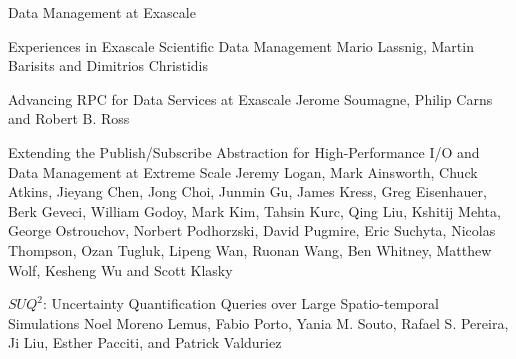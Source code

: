 \documentclass[11pt]{article}
\begin{document}
\begin{bulletin}
\begin{articlesection}{Data Management at Exascale}
%
%

\makeatletter
\renewcommand{\AB@affillist}{}
\renewcommand{\AB@authlist}{}
\setcounter{authors}{0}
\makeatother

\begin{article}
{Experiences in Exascale Scientific Data Management}
{Mario Lassnig, Martin Barisits and Dimitrios Christidis}
\graphicspath{{submissions/mario/}}

\end{article}

\makeatletter
\renewcommand{\AB@affillist}{}
\renewcommand{\AB@authlist}{}
\setcounter{authors}{0}
\makeatother

\begin{article}
{Advancing RPC for Data Services at Exascale}
{Jerome Soumagne, Philip Carns and Robert B. Ross}
\graphicspath{{submissions/jerome/}}

\end{article}

\makeatletter
\renewcommand{\AB@affillist}{}
\renewcommand{\AB@authlist}{}
\setcounter{authors}{0}
\makeatother

\begin{article}
{Extending the Publish/Subscribe Abstraction for High-Performance I/O and Data Management at Extreme Scale}
{Jeremy Logan, Mark Ainsworth, Chuck Atkins, Jieyang Chen, Jong Choi, Junmin Gu, James Kress, Greg Eisenhauer, Berk Geveci, William Godoy, Mark Kim, Tahsin Kurc, Qing Liu, Kshitij Mehta, George Ostrouchov, Norbert Podhorzski, David Pugmire, Eric Suchyta, Nicolas Thompson, Ozan Tugluk, Lipeng Wan, Ruonan Wang, Ben Whitney, Matthew Wolf, Kesheng Wu and Scott Klasky}
\graphicspath{{submissions/jeremy/}}

\end{article}

\makeatletter
\renewcommand{\AB@affillist}{}
\renewcommand{\AB@authlist}{}
\setcounter{authors}{0}
\makeatother

\begin{article}
{$SUQ^{2}$: Uncertainty Quantification Queries over Large Spatio-temporal Simulations}
{Noel Moreno Lemus, Fabio Porto, Yania M. Souto, Rafael S. Pereira, Ji Liu, Esther Pacciti, and Patrick Valduriez}
\graphicspath{{submissions/fabio/}}

\end{article}


\end{articlesection}
\end{bulletin}
\end{document}
